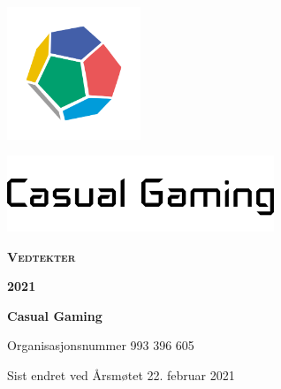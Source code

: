 \begin{titlepage}
    \centering
    \vspace*{1cm}
    \includegraphics[width=4cm]{innhold/logo-terning.png}\par
    \includegraphics[width=8cm]{innhold/logo-tekst.png}\par
    \vspace*{4cm}
    {\rmfamily\Huge\bfseries\scshape Vedtekter}\par
    \vspace*{0.5cm}
    {\rmfamily\LARGE\bfseries\scshape 2021}\par
    \vfill
    {\bfseries Casual Gaming}\par
    \vspace*{0.5cm}
    {Organisasjonsnummer 993 396 605}\par
    \vspace*{0.5cm}
    {Sist endret ved Årsmøtet 22. februar 2021}\par
\end{titlepage}

